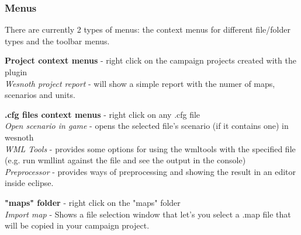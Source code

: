 \documentclass[10pt]{article}
\begin{document}
\subsubsection{Menus}
There are currently 2 types of menus: the context menus for different file/folder types and the toolbar menus.
\begin{description}
\item{\textbf{Project context menus}} - right click on the campaign projects created with the plugin\\
   {\it Wesnoth project report} - will show a simple report with the numer of maps, scenarios and units.

\item{\textbf{.cfg files context menus}} - right click on any .cfg file\\
   {\it Open scenario in game} - opens the selected file's scenario (if it contains one) in wesnoth \\
   {\it WML Tools} - provides some options for using the wmltools with the specified file
   (e.g. run wmllint against the file and see the output in the console) \\
   {\it Preprocessor} - provides ways of preprocessing and showing the result in an editor inside eclipse.

\item{\textbf{"maps" folder}} - right click on the "maps" folder\\
   {\it Import map} - Shows a file selection window that let's you select a .map file that will be copied in your campaign project.

\end{description}
\end{document}
